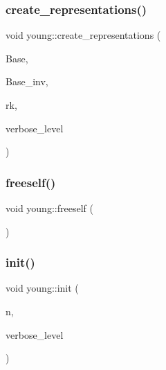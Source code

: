 \mbox{\label{classyoung_ac8179e6c679636e61f6effd72e392a15}} 
\subsubsection{\texorpdfstring{create\+\_\+representations()}{create\_representations()}}
{\footnotesize\ttfamily void young\+::create\+\_\+representations (\begin{DoxyParamCaption}\item[{\mbox{\hyperlink{galois_8h_a09fddde158a3a20bd2dcadb609de11dc}{I\+NT}} $\ast$}]{Base,  }\item[{\mbox{\hyperlink{galois_8h_a09fddde158a3a20bd2dcadb609de11dc}{I\+NT}} $\ast$}]{Base\+\_\+inv,  }\item[{\mbox{\hyperlink{galois_8h_a09fddde158a3a20bd2dcadb609de11dc}{I\+NT}}}]{rk,  }\item[{\mbox{\hyperlink{galois_8h_a09fddde158a3a20bd2dcadb609de11dc}{I\+NT}}}]{verbose\+\_\+level }\end{DoxyParamCaption})}

\mbox{\label{classyoung_a5476a4dd5d5ac9c54065b5144f134e32}} 
\subsubsection{\texorpdfstring{freeself()}{freeself()}}
{\footnotesize\ttfamily void young\+::freeself (\begin{DoxyParamCaption}{ }\end{DoxyParamCaption})}

\mbox{\label{classyoung_abbcd21425b16be0635f5ede77c0cdc28}} 
\subsubsection{\texorpdfstring{init()}{init()}}
{\footnotesize\ttfamily void young\+::init (\begin{DoxyParamCaption}\item[{\mbox{\hyperlink{galois_8h_a09fddde158a3a20bd2dcadb609de11dc}{I\+NT}}}]{n,  }\item[{\mbox{\hyperlink{galois_8h_a09fddde158a3a20bd2dcadb609de11dc}{I\+NT}}}]{verbose\+\_\+level }\end{DoxyParamCaption})}

